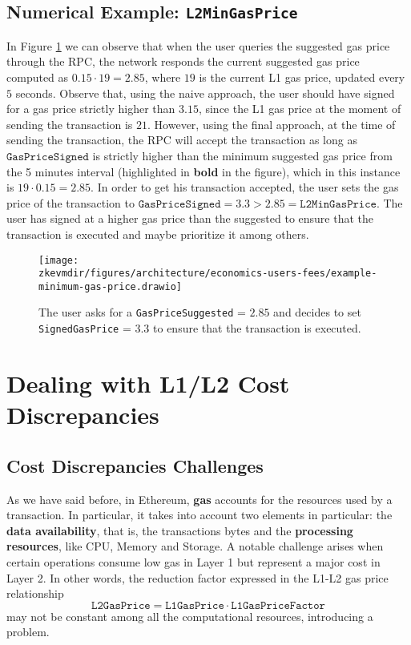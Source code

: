 \subsection{Numerical Example: \texttt{L2MinGasPrice}}


In Figure \ref{fig:numerical-example} we can observe that when the user queries the suggested gas price through the RPC, the network responds the current suggested gas price computed as $0.15 \cdot 19 = 2.85$, where $19$ is the current L1 gas price, updated every $5$ seconds. Observe that, using the naive approach, the user should have signed for a gas price strictly higher than $3.15$, since the L1 gas price at the moment of sending the transaction is $21$. However, using the final approach, at the time of sending the transaction, the RPC will accept the transaction as long as $\texttt{GasPriceSigned}$ is strictly higher than the minimum suggested gas price from the 5 minutes interval (highlighted in \textbf{bold} in the figure), which in this instance is $19 \cdot 0.15 = 2.85$. In order to get his transaction accepted, the user sets the gas price of the transaction to $\texttt{GasPriceSigned} = 3.3 > 2.85 = \texttt{L2MinGasPrice}.$ The user has signed at a higher gas price than the suggested to ensure that the transaction is executed and maybe prioritize it among others.


\begin{figure}[H]
\centering
\texttt{[image: \\zkevmdir/figures/architecture/economics-users-fees/example-minimum-gas-price.drawio]}
\caption{The user asks for a \texttt{GasPriceSuggested} = $2.85$ and decides to set \texttt{SignedGasPrice} = $3.3$ to ensure that the transaction is executed.}
\label{fig:numerical-example}
\end{figure}





\section{Dealing with L1/L2 Cost Discrepancies}

\subsection{Cost Discrepancies Challenges}

As we have said before, in Ethereum, \textbf{gas} accounts for the resources used by a transaction. In particular, it takes into account two elements in particular: the \textbf{data availability}, that is, the transactions bytes and the \textbf{processing resources}, like CPU, Memory and Storage. A notable challenge arises when certain operations consume low gas in Layer 1 but represent a major cost in Layer 2. In other words, the reduction factor expressed in the L1-L2 gas price relationship
\[
\texttt{L2GasPrice} = \texttt{L1GasPrice} \cdot \texttt{L1GasPriceFactor}
\]
may not be constant among all the computational resources, introducing a problem.

